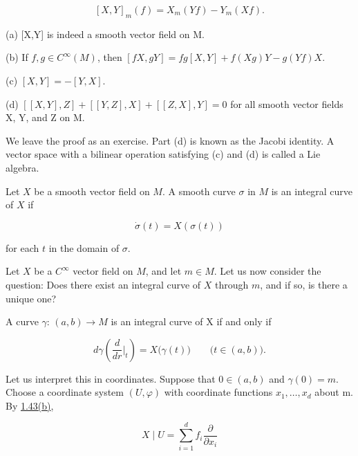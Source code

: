 \begin{equation}
	\tag{1}\label{eq:1.44:1}
	[X,Y]_{m}(f)=X_{m}(Y f)-Y_{m}(X f).
\end{equation}

\begin{proposition}\label{thm:1.45}
	(a) [X,Y] is indeed a smooth vector field on M.

	(b) If $f, g \in C^{\infty}(M)$, then $[fX, gY] = fg[X, Y] + f(Xg)Y - g(Yf)X$.

	(c)  $ [X,Y] = -[Y,X] $.

	(d)  $ [[X,Y],Z] + [[Y,Z],X] + [[Z,X],Y] = 0 $ for all smooth vector fields X, Y, and Z on M.

	We leave the proof as an exercise. Part (d) is known as the Jacobi identity. A vector space with a bilinear operation satisfying (c) and (d) is called a Lie algebra. 

\end{proposition}

\begin{definition}\label{thm:1.46}
	Let $X$ be a smooth vector field on $M$. A smooth curve $\sigma$ in $M$ is an integral curve of $X$ if

	\begin{equation}
		\tag{1}\label{eq:1.46:1}
		\dot{\sigma}(t)=X(\sigma(t))
	\end{equation}

	for each $t$ in the domain of $\sigma$.
\end{definition}

\label{thm:1.47}
Let $X$ be a $C^\infty$ vector field on $M$, and let $m \in M$. Let us now consider the question: Does there exist an integral curve of $X$ through $m$, and if so, is there a unique one?

A curve  $ \gamma $:  $ (a,b) \to M $ is an integral curve of X if and only if

\begin{equation}
	\tag{1}\label{eq:1.47:1}
	d\gamma\left(\frac{d}{d r}\bigg|_{t}\right)=X\big(\gamma(t)\big)\qquad\big(t\in(a,b)\big).
\end{equation}

Let us interpret this in coordinates. Suppose that  $ 0 \in (a,b) $ and  $ \gamma(0) = m $. Choose a coordinate system  $ (U,\varphi) $ with coordinate functions  $ x_1, \ldots, x_d $ about m. By \hyperref[thm:1.43]{1.43(b)},

\begin{equation}
	\tag{2}\label{eq:1.47:2}
	X\mid U=\sum_{i=1}^{d}f_{i}\frac{\partial}{\partial x_{i}}
\end{equation}


